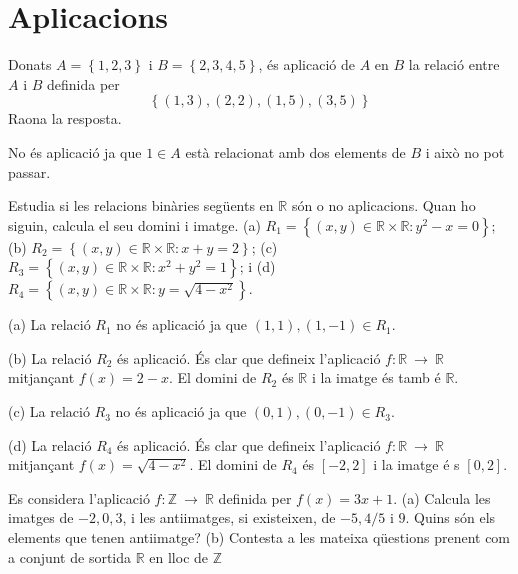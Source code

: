 \section{Aplicacions}

\begin{exer}
Donats $A=\left\{ 1,2,3\right\} $ i $B=\left\{ 2,3,4,5\right\} $, \'{e}s
aplicaci\'{o} de $A$ en $B$ la relaci\'{o} entre $A$ i $B$ definida per%
\begin{equation*}
\left\{ (1,3),(2,2),(1,5),(3,5)\right\}
\end{equation*}%
Raona la resposta.
\end{exer}

\begin{solucio}
No \'{e}s aplicaci\'{o} ja que $1\in A$ est\`{a} relacionat amb dos elements
de $B$ i aix\`{o} no pot passar.
\end{solucio}

\begin{exer}
Estudia si les relacions bin\`{a}ries seg\"{u}ents en $\mathbb{R}$ s\'{o}n o
no aplicacions. Quan ho siguin, calcula el seu domini i imatge. (a) $%
R_{1}=\left\{ (x,y)\in \mathbb{R}\times \mathbb{R}:y^{2}-x=0\right\} $; (b) $%
R_{2}=\left\{ (x,y)\in \mathbb{R}\times \mathbb{R}:x+y=2\right\} $; (c) $%
R_{3}=\left\{ (x,y)\in \mathbb{R}\times \mathbb{R}:x^{2}+y^{2}=1\right\} $;
i (d) $R_{4}=\left\{ (x,y)\in \mathbb{R}\times \mathbb{R}:y=\sqrt{4-x^{2}}%
\right\} $.
\end{exer}

\begin{solucio}
(a) La relaci\'{o} $R_{1}$ no \'{e}s aplicaci\'{o} ja que $(1,1),(1,-1)\in
R_{1}$.

(b) La relaci\'{o} $R_{2}$ \'{e}s aplicaci\'{o}. \'{E}s clar que defineix
l'aplicaci\'{o} $f:\mathbb{R}~\longrightarrow ~\mathbb{R}$ mitjan\c{c}ant $%
f(x)=2-x$. El domini de $R_{2}$ \'{e}s $\mathbb{R}$ i la imatge \'{e}s tamb%
\'{e} $\mathbb{R}$.

(c) La relaci\'{o} $R_{3}$ no \'{e}s aplicaci\'{o} ja que $(0,1),(0,-1)\in
R_{3}$.

(d) La relaci\'{o} $R_{4}$ \'{e}s aplicaci\'{o}. \'{E}s clar que defineix
l'aplicaci\'{o} $f:\mathbb{R}~\longrightarrow ~\mathbb{R}$ mitjan\c{c}ant $%
f(x)=\sqrt{4-x^{2}}$. El domini de $R_{4}$ \'{e}s $[-2,2]$ i la imatge \'{e}%
s $[0,2]$.
\end{solucio}

\begin{exer}
Es considera l'aplicaci\'{o} $f:\mathbb{Z}~\longrightarrow ~\mathbb{R}$
definida per $f(x)=3x+1$. (a) Calcula les imatges de $-2,0,3$, i les
antiimatges, si existeixen, de $-5,4/5$ i $9$. Quins s\'{o}n els elements
que tenen antiimatge? (b) Contesta a les mateixa q\"{u}estions prenent com a
conjunt de sortida $\mathbb{R}$ en lloc de $\mathbb{Z}$
\end{exer}

